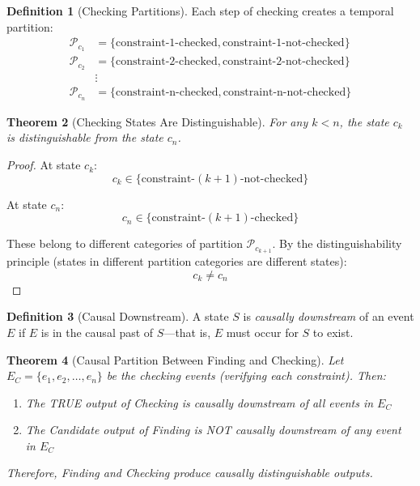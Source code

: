 \documentclass[twocolumn,10pt]{article}
\newtheorem{theorem}{Theorem}[section]
\theoremstyle{definition}
\newtheorem{definition}[theorem]{Definition}
\theoremstyle{remark}
\begin{document}
\begin{definition}[Checking Partitions]
Each step of checking creates a temporal partition:
\begin{align}
\mathcal{P}_{c_1} &= \{\text{constraint-1-checked}, \text{constraint-1-not-checked}\} \\
\mathcal{P}_{c_2} &= \{\text{constraint-2-checked}, \text{constraint-2-not-checked}\} \\
&\vdots \\
\mathcal{P}_{c_n} &= \{\text{constraint-n-checked}, \text{constraint-n-not-checked}\}
\end{align}
\end{definition}

\begin{theorem}[Checking States Are Distinguishable]
\label{thm:checking_distinguishable}
For any $k < n$, the state $c_k$ is distinguishable from the state $c_n$.
\end{theorem}

\begin{proof}
At state $c_k$:
\begin{equation}
c_k \in \{\text{constraint-}(k+1)\text{-not-checked}\}
\end{equation}

At state $c_n$:
\begin{equation}
c_n \in \{\text{constraint-}(k+1)\text{-checked}\}
\end{equation}

These belong to different categories of partition $\mathcal{P}_{c_{k+1}}$. By the distinguishability principle (states in different partition categories are different states):
\begin{equation}
c_k \neq c_n
\end{equation}
\end{proof}

\begin{definition}[Causal Downstream]
A state $S$ is \emph{causally downstream} of an event $E$ if $E$ is in the causal past of $S$—that is, $E$ must occur for $S$ to exist.
\end{definition}

\begin{theorem}[Causal Partition Between Finding and Checking]
\label{thm:causal_partition_fc}
Let $E_C = \{e_1, e_2, \ldots, e_n\}$ be the checking events (verifying each constraint). Then:
\begin{enumerate}
\item The TRUE output of Checking is causally downstream of all events in $E_C$
\item The Candidate output of Finding is NOT causally downstream of any event in $E_C$
\end{enumerate}
Therefore, Finding and Checking produce causally distinguishable outputs.
\end{theorem}
\end{document}
